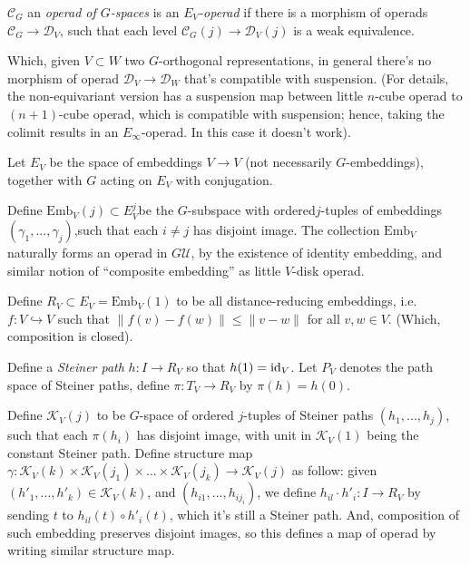 \documentclass{article}
\begin{document}
\begin{defn}
    $\mathcal{C}_G$ an \emph{operad of $G$-spaces} is an \emph{$E_V$-operad} if there is a morphism of operads $\mathcal{C}_G\rightarrow \mathcal{D}_V$, such that each level $\mathcal{C}_G(j)\rightarrow \mathcal{D}_V (j)$ is a weak equivalence.
\end{defn}

Which, given $V\subset W$ two $G$-orthogonal representations, in general there's no morphism of operad $\mathcal{D}_V\rightarrow\mathcal{D}_W$ that's compatible with suspension. (For details, the non-equivariant version has a suspension map between little $n$-cube operad to $(n+1)$-cube operad, which is compatible with suspension; hence, taking the colimit results in an $E_\infty$-operad. In this case it doesn't work).

\hfil

\begin{defn}
    Let $E_V$ be the space of embeddings $V\rightarrow V$ (not necessarily $G$-embeddings), together with $G$ acting on $E_V$ with conjugation.

    Define $\text{Emb}_V (j)\subset E_V^j$be the $G$-subspace with ordered$j$-tuples of embeddings $(\gamma_1,...,\gamma_j)$,such that each $i\neq j$ has disjoint image. The collection $\text{Emb}_V$ naturally forms an operad in $G\mathcal{U}$, by the existence of identity embedding, and similar notion of ``composite embedding'' as little $V$-disk operad.
\end{defn}

\begin{defn}
    Define $R_V\subset E_V = \text{Emb}_V (1)$ to be all distance-reducing embeddings, i.e. $f:V\hookrightarrow V$ such that $\|f(v)-f(w)\|\leq \|v-w\|$ for all $v,w\in V$. (Which, composition is closed).

    Define a \emph{Steiner path} $h:I\rightarrow R_V$ so that $h(1)=\mathrm{id}_V$. Let $P_V$ denotes the path space of Steiner paths, define $\pi:T_V\rightarrow R_V$ by $\pi(h)=h(0)$.

    \hfil

    Define $\mathcal{K}_V (j)$ to be $G$-space of ordered $j$-tuples of Steiner paths $(h_1,...,h_j)$, such that each $\pi(h_i)$ has disjoint image, with unit in $\mathcal{K}_V (1)$ being the constant Steiner path. Define structure map $\gamma:\mathcal{K}_V (k)\times \mathcal{K}_V (j_1)\times...\times \mathcal{K}_V (j_k)\rightarrow\mathcal{K}_V (j)$ as follow: given $(h'_1,...,h'_k)\in\mathcal{K}_V (k)$, and $(h_{i1},...,h_{ij_i})$, we define $h_{il}\cdot h'_i:I\rightarrow R_V$ by sending $t$ to $h_{il}(t)\circ h'_i (t)$, which it's still a Steiner path. And, composition of such embedding preserves disjoint images, so this defines a map of operad by writing similar structure map.
\end{defn}
\end{document}
